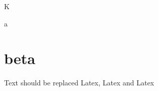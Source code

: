 %
%

\def\replace#1#2#3{
	\def\tmp##1#2{##1#3\tmp}
	\tmp#1\stopreplace#2\stopreplace}
\def\stopreplace#1\stopreplace{}

K

\newpage

a
\newpage
\section{beta}

\replace{Text should be replaced here, here and here}{here}{Latex}
\replace{Pablo|Pizarro}{|}{\\}